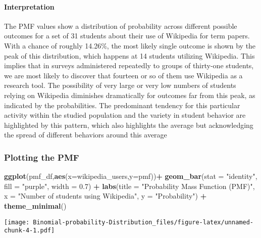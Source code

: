 \documentclass[
]{article}
\newenvironment{Shaded}{\begin{snugshade}}{\end{snugshade}}
\newcommand{\AttributeTok}[1]{\textcolor[rgb]{0.13,0.29,0.53}{#1}}
\newcommand{\FloatTok}[1]{\textcolor[rgb]{0.00,0.00,0.81}{#1}}
\newcommand{\FunctionTok}[1]{\textcolor[rgb]{0.13,0.29,0.53}{\textbf{#1}}}
\newcommand{\NormalTok}[1]{#1}
\newcommand{\SpecialCharTok}[1]{\textcolor[rgb]{0.81,0.36,0.00}{\textbf{#1}}}
\newcommand{\StringTok}[1]{\textcolor[rgb]{0.31,0.60,0.02}{#1}}
\begin{document}
\paragraph{Interpretation}\label{interpretation}

The PMF values show a distribution of probability across different
possible outcomes for a set of 31 students about their use of Wikipedia
for term papers. With a chance of roughly 14.26\%, the most likely
single outcome is shown by the peak of this distribution, which happens
at 14 students utilizing Wikipedia. This implies that in surveys
administered repeatedly to groups of thirty-one students, we are most
likely to discover that fourteen or so of them use Wikipedia as a
research tool. The possibility of very large or very low numbers of
students relying on Wikipedia diminishes dramatically for outcomes far
from this peak, as indicated by the probabilities. The predominant
tendency for this particular activity within the studied population and
the variety in student behavior are highlighted by this pattern, which
also highlights the average but acknowledging the spread of different
behaviors around this average

\subsubsection{Plotting the PMF}\label{plotting-the-pmf}

\begin{Shaded}
\begin{Highlighting}[]
\FunctionTok{ggplot}\NormalTok{(pmf\_df,}\FunctionTok{aes}\NormalTok{(}\AttributeTok{x=}\NormalTok{wikipedia\_users,}\AttributeTok{y=}\NormalTok{pmf))}\SpecialCharTok{+}
       \FunctionTok{geom\_bar}\NormalTok{(}\AttributeTok{stat =} \StringTok{"identity"}\NormalTok{, }\AttributeTok{fill =} \StringTok{"purple"}\NormalTok{, }\AttributeTok{width =} \FloatTok{0.7}\NormalTok{) }\SpecialCharTok{+}
  \FunctionTok{labs}\NormalTok{(}\AttributeTok{title =} \StringTok{"Probability Mass Function (PMF)"}\NormalTok{,}
       \AttributeTok{x =} \StringTok{"Number of students using Wikipedia"}\NormalTok{,}
       \AttributeTok{y =} \StringTok{"Probability"}\NormalTok{) }\SpecialCharTok{+}
  \FunctionTok{theme\_minimal}\NormalTok{()}
\end{Highlighting}
\end{Shaded}

\texttt{[image: Binomial-probability-Distribution\_files/figure-latex/unnamed-chunk-4-1.pdf]}
\end{document}

